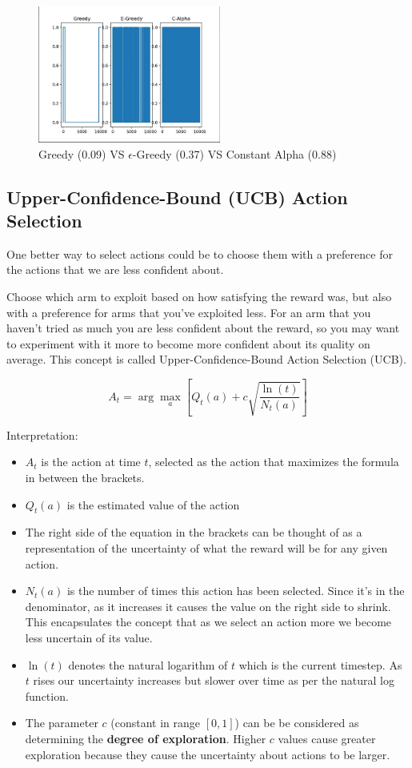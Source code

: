 \begin{figure}[h]
    \centering
    \includegraphics[height=4.5cm]{Pictures/deep-reinforcement-learning/greedy-vs-e-greedy-vs-c-alpha.jpg}
    \caption{Greedy (0.09) VS $\epsilon$-Greedy (0.37) VS Constant Alpha (0.88)}
\end{figure}

\subsection{Upper-Confidence-Bound (UCB) Action Selection \cite{medium-numsmt2-rl-ch2-part-4}}\label{MAB: Upper-Confidence-Bound (UCB) Action Selection}

One better way to select actions could be to choose them with a preference for the actions that we are less confident about.

Choose which arm to exploit based on how satisfying the reward was, but also with a preference for arms that you’ve exploited less. For an arm that you haven’t tried as much you are less confident about the reward, so you may want to experiment with it more to become more confident about its quality on average. This concept is called Upper-Confidence-Bound Action Selection (UCB).

\[
    A_t = \arg\max_a \left[ Q_t(a) + c \sqrt{\displaystyle\frac{\ln(t)}{N_t(a)}} \right]
\]

Interpretation:
\begin{itemize}
    \item $A_t$ is the action at time $t$, selected as the action that maximizes the formula in between the brackets.
    \item $Q_t(a)$ is the estimated value of the action
    \item The right side of the equation in the brackets can be thought of as a representation of the uncertainty of what the reward will be for any given action.
    \item $N_t(a)$ is the number of times this action has been selected. Since it’s in the denominator, as it increases it causes the value on the right side to shrink. This encapsulates the concept that as we select an action more we become less uncertain of its value.
    \item $\ln(t)$ denotes the natural logarithm of $t$ which is the current timestep. As $t$ rises our uncertainty increases but slower over time as per the natural log function.
    \item The parameter $c$ (constant in range $[0, 1]$) can be be considered as determining the \textbf{degree of exploration}. Higher $c$ values cause greater exploration because they cause the uncertainty about actions to be larger.
\end{itemize}



